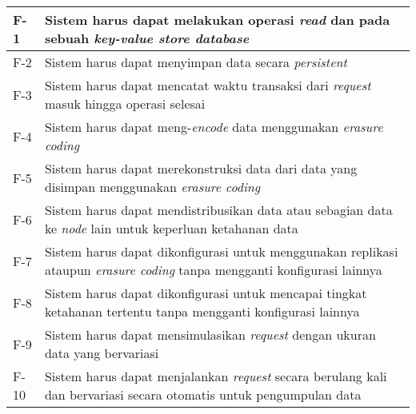 \begin{longtable}{|l|p{13cm}|}
	F-1                    & Sistem harus dapat melakukan operasi \textit{read} dan \text{write} pada sebuah \textit{key-value store database}                \\ \hline
	F-2                    & Sistem harus dapat menyimpan data secara \textit{persistent}                                                                     \\ \hline
	F-3                    & Sistem harus dapat mencatat waktu transaksi dari \textit{request} masuk hingga operasi selesai                                   \\ \hline
	F-4                    & Sistem harus dapat meng-\textit{encode} data menggunakan \textit{erasure coding}                                                 \\ \hline
	F-5                    & Sistem harus dapat merekonstruksi data dari data yang disimpan menggunakan \textit{erasure coding}                               \\ \hline
	F-6                    & Sistem harus dapat mendistribusikan data atau sebagian data ke \textit{node} lain untuk keperluan ketahanan data                 \\ \hline
	F-7                    & Sistem harus dapat dikonfigurasi untuk menggunakan replikasi ataupun \textit{erasure coding} tanpa mengganti konfigurasi lainnya \\ \hline
	F-8                    & Sistem harus dapat dikonfigurasi untuk mencapai tingkat ketahanan tertentu tanpa mengganti konfigurasi lainnya                   \\ \hline
	F-9                    & Sistem harus dapat mensimulasikan \textit{request} dengan ukuran data yang bervariasi                                            \\ \hline
	F-10                   & Sistem harus dapat menjalankan \textit{request} secara berulang kali dan bervariasi secara otomatis untuk pengumpulan data       \\ \hline
\end{longtable}
